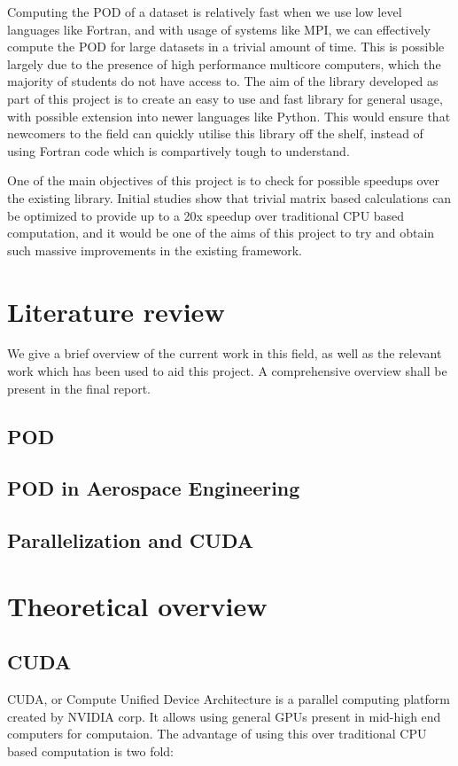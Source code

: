\documentclass[]{aiaa-tc_mod}%
\begin{document}
Computing the POD of a dataset is relatively fast when we use low level languages
like Fortran, and with usage of systems like MPI, we can effectively compute the
POD for large datasets in a trivial amount of time. This is possible largely due
to the presence of high performance multicore computers, which the majority of 
students do not have access to. The aim of the library developed as part of this
project is to create an easy to use and fast library for general usage, with 
possible extension into newer languages like Python. This would ensure that 
newcomers to the field can quickly utilise this library off the shelf, instead of
using Fortran code which is compartively tough to understand. 

One of the main objectives of this project is to check for possible speedups
over the existing library. Initial studies show that trivial matrix based
calculations can be optimized to provide up to a 20x speedup over traditional 
CPU based computation, and it would be one of the aims of this project to try
and obtain such massive improvements in the existing framework. 
\section{Literature review}
We give a brief overview of the current work in this field, as well as the 
relevant work which has been used to aid this project. A comprehensive overview 
shall be present in the final report.

\subsection{POD}
\subsection{POD in Aerospace Engineering}
\subsection{Parallelization and CUDA}

\section{Theoretical overview}
\subsection{CUDA}
CUDA, or Compute Unified Device Architecture is a parallel computing platform 
created by NVIDIA corp. It allows using general GPUs present in mid-high end 
computers for computaion. The advantage of using this over traditional CPU based
computation is two fold:
\end{document}
